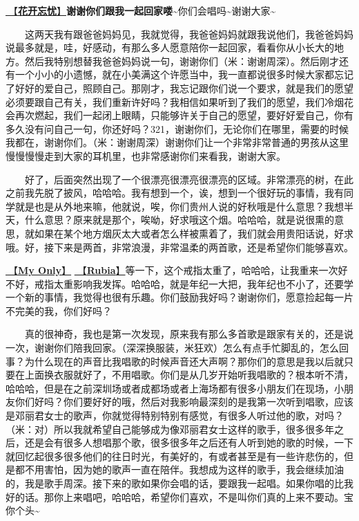 \documentclass[]{ctexbook}
\begin{document}
\hyperref[no-worries]{🎵【\textbf{花开忘忧}】}\textbf{谢谢你们跟我一起回家喽\textasciitilde{}}你们会唱吗\textasciitilde 谢谢大家\textasciitilde{}

  这两天我有跟爸爸妈妈见，我就觉得，我爸爸妈妈就跟我说他们，我爸爸妈妈说最多就是，哇，好感动，有那么多人愿意陪你一起回家，看看你从小长大的地方。然后我特别想替我爸爸妈妈说一句，谢谢你们（米：谢谢周深）。然后刚才还有一个小小的小遗憾，就在小美满这个许愿当中，我一直都说很多时候大家都忘记了好好的爱自己，照顾自己。那刚才，我忘记跟你们说一个要求，就是我们的愿望必须要跟自己有关，我们重新许好吗？我相信如果听到了我们的愿望，我们冷烟花会再次燃起，我们一起闭上眼睛，只能够许关于自己的愿望，要好好爱自己，你有多久没有问自己一句，你还好吗？321，谢谢你们，无论你们在哪里，需要的时候我都在，谢谢你们。（米：谢谢周深）谢谢你们让一个非常非常普通的男孩从这里慢慢慢慢走到大家的耳机里，也非常感谢你们来看我，谢谢大家。

  好了，后面突然出现了一个很漂亮很漂亮很漂亮的区域。非常漂亮的树，在此之前我先脱了披风，哈哈哈。我有想到一个，诶，想到一个很好玩的事情，我有同学就是也是从外地来嘛，他就说，唉，你们贵州人说的好秋哦是什么意思？我想半天，什么意思？原来就是那个，唉呦，好求哦这个烟。哈哈哈，就是说很熏的意思，就如果在某个地方烟灰太大或者怎么样被熏着了，我们就会用贵阳话说，好求哦。好，接下来是两首，非常浪漫，非常温柔的两首歌，还是希望你们能够喜欢。

\hyperref[my-only]{🎵【\textbf{My Only}】} \hyperref[rubia]{🎵【\textbf{Rubia}】}等一下，这个戒指太重了，哈哈哈，让我重来一次好不好，戒指太重影响我发挥。哈哈哈，就是年纪一大把，我年纪也不小了，还要学一个新的事情，我觉得也很有乐趣。你们鼓励我好吗？谢谢你们，愿意捡起每一片不完美的我，你们好吗？

  真的很神奇，我也是第一次发现，原来我有那么多首歌是跟家有关的，还是说一次，谢谢你们陪我回家。（深深换服装，米狂欢）怎么有点手忙脚乱的，怎么回事？为什么现在的声音比我唱歌的时候声音还大声啊？那你们的意思是我以后就只要在上面换衣服就好了，不用唱歌。你们是从几岁开始听我唱歌的？根本听不清，哈哈哈，但是在之前深圳场或者成都场或者上海场都有很多小朋友们在现场，小朋友你们好吗？你们要好好的哦，然后对我影响最深刻的是我第一次听到唱歌，应该是邓丽君女士的歌声，你就觉得特别特别有感觉，有很多人听过他的歌，对吗？（米：对）所以我就希望自己能够成为像邓丽君女士这样的歌手，很多很多年之后，还是会有很多人想唱那个歌，很多很多年之后还有人听到她的歌的时候，一下就回忆起很多很多他们的往日时光，有美好的，有或者甚至是有一些许悲伤的，但是都不用害怕，因为她的歌声一直在陪伴。我想成为这样的歌手，我会继续加油的，我是歌手周深。接下来的歌如果你会唱的话，要跟我一起唱。如果你唱的比我好的话。那你上来唱吧，哈哈哈，希望你们喜欢，不是叫你们真的上来不要动。宝你个头\textasciitilde{}
\end{document}
